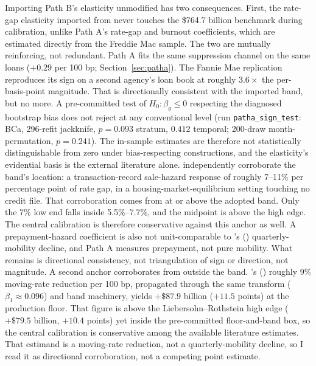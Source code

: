 \documentclass[12pt]{article}
\newcommand{\citepos}[1]{\citeauthor{#1}'s (\citeyear{#1})}
\begin{document}
Importing Path B's elasticity unmodified has two consequences. First, the rate-gap elasticity imported from \citet{liebersohn2024} never touches the \$764.7 billion benchmark during calibration, unlike Path A's rate-gap and burnout coefficients, which are estimated directly from the Freddie Mac sample. The two are mutually reinforcing, not redundant. Path A fits the same suppression channel on the same loans ($+0.29$ per 100 bp; Section~\ref{sec:patha}). The Fannie Mae replication reproduces its sign on a second agency's loan book at roughly $3.6\times$ the per-basis-point magnitude. That is directionally consistent with the imported band, but no more. A pre-committed test of $H_0\!: \beta_g \le 0$ respecting the diagnosed bootstrap bias does not reject at any conventional level (run \texttt{patha\_sign\_test}: BCa, 296-refit jackknife, $p = 0.093$ stratum, $0.412$ temporal; 200-draw month-permutation, $p = 0.241$). The in-sample estimates are therefore not statistically distinguishable from zero under bias-respecting constructions, and the elasticity's evidential basis is the external literature alone. \citet{graybill2026} independently corroborate the band's location: a transaction-record sale-hazard response of roughly 7--11\% per percentage point of rate gap, in a housing-market-equilibrium setting touching no credit file. That corroboration comes from at or above the adopted band. Only the 7\% low end falls inside 5.5\%--7.7\%, and the midpoint is above the high edge. The central calibration is therefore conservative against this anchor as well. A prepayment-hazard coefficient is also not unit-comparable to \citepos{liebersohn2024} quarterly-mobility decline, and Path A measures prepayment, not pure mobility. What remains is directional consistency, not triangulation of sign or direction, not magnitude. A second anchor corroborates from outside the band. \citepos{fonseca2024} roughly 9\% moving-rate reduction per 100 bp, propagated through the same transform ($\beta_1 \approx 0.096$) and band machinery, yields $+\$87.9$ billion ($+11.5$ points) at the production floor. That figure is above the Liebersohn--Rothstein high edge ($+\$79.5$ billion, $+10.4$ points) yet inside the pre-committed floor-and-band box, so the central calibration is conservative among the available literature estimates. That estimand is a moving-rate reduction, not a quarterly-mobility decline, so I read it as directional corroboration, not a competing point estimate.
\end{document}
